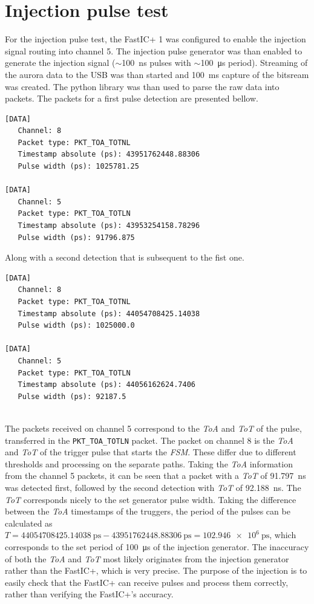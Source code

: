 \section{Injection pulse test}
For the injection pulse test, the FastIC+ 1 was configured to enable the injection signal routing into channel 5. The injection pulse generator was than enabled to generate the injection signal ($\sim$\SI{100}{\nano\second} pulses with $\sim$\SI{100}{\micro\second} period). Streaming of the aurora data to the USB was than started and \SI{100}{\milli\second} capture of the bitsream was created. The python library was than used to parse the raw data into packets. The packets for a first pulse detection are presented bellow.
\begin{small}
\begin{verbatim}
[DATA] 
   Channel: 8 
   Packet type: PKT_TOA_TOTNL 
   Timestamp absolute (ps): 43951762448.88306 
   Pulse width (ps): 1025781.25 

[DATA] 
   Channel: 5 
   Packet type: PKT_TOA_TOTLN 
   Timestamp absolute (ps): 43953254158.78296 
   Pulse width (ps): 91796.875 

\end{verbatim}
\end{small}
\newpage
Along with a second detection that is subsequent to the fist one.
\begin{small}
\begin{verbatim}
[DATA] 
   Channel: 8 
   Packet type: PKT_TOA_TOTNL 
   Timestamp absolute (ps): 44054708425.14038 
   Pulse width (ps): 1025000.0 

[DATA] 
   Channel: 5 
   Packet type: PKT_TOA_TOTLN 
   Timestamp absolute (ps): 44056162624.7406 
   Pulse width (ps): 92187.5 
  
\end{verbatim}
\end{small}

The packets received on channel 5 correspond to the \emph{ToA} and \emph{ToT} of the pulse, transferred in the \verb|PKT_TOA_TOTLN| packet. The packet on channel 8 is the \emph{ToA} and \emph{ToT} of the trigger pulse that starts the \emph{FSM}. These differ due to different thresholds and processing on the separate paths. Taking the \emph{ToA} information from the channel 5 packets, it can be seen that a packet with a \emph{ToT} of \SI{91.797}{\nano\second} was detected first, followed by the second detection with \emph{ToT} of \SI{92.188}{\nano\second}. The \emph{ToT} corresponds nicely to the set generator pulse width. Taking the difference between the \emph{ToA} timestamps of the truggers, the period of the pulses can be calculated as $T = \SI{44054708425.14038}{\pico\second} - \SI{43951762448.88306}{\pico\second} = \SI{102.946e6}{\pico\second}$, which corresponds to the set period of \SI{100}{\micro\second} of the injection generator. The inaccuracy of both the \emph{ToA} and \emph{ToT} most likely originates from the injection generator rather than the FastIC+, which is very precise. The purpose of the injection is to easily check that the FastIC+ can receive pulses and process them correctly, rather than verifying the FastIC+'s accuracy. 


